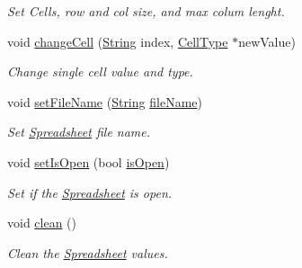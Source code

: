 \begin{DoxyCompactItemize}
\begin{DoxyCompactList}\small\item\em Set Cells, row and col size, and max colum lenght. \end{DoxyCompactList}\item 
\mbox{\label{class_spreadsheet_a0bf601cc24e9a3cc62a116e1e8e3a74f}} 
void \hyperlink{class_spreadsheet_a0bf601cc24e9a3cc62a116e1e8e3a74f}{change\+Cell} (\hyperlink{class_string}{String} index, \hyperlink{class_cell_type}{Cell\+Type} $\ast$new\+Value)
\begin{DoxyCompactList}\small\item\em Change single cell value and type. \end{DoxyCompactList}\item 
\mbox{\label{class_spreadsheet_a24589d9a703aa835682bf3222e944ddb}} 
void \hyperlink{class_spreadsheet_a24589d9a703aa835682bf3222e944ddb}{set\+File\+Name} (\hyperlink{class_string}{String} \hyperlink{class_spreadsheet_a29e1c16f68d43f5ce96c15f1c18c71de}{file\+Name})
\begin{DoxyCompactList}\small\item\em Set \hyperlink{class_spreadsheet}{Spreadsheet} file name. \end{DoxyCompactList}\item 
\mbox{\label{class_spreadsheet_aa3a53ae9bccfcaf880465198dc7f4e33}} 
void \hyperlink{class_spreadsheet_aa3a53ae9bccfcaf880465198dc7f4e33}{set\+Is\+Open} (bool \hyperlink{class_spreadsheet_a4c8bab95a22c86d5a8a75e54a7e82c51}{is\+Open})
\begin{DoxyCompactList}\small\item\em Set if the \hyperlink{class_spreadsheet}{Spreadsheet} is open. \end{DoxyCompactList}\item 
void \hyperlink{class_spreadsheet_a5c0f7b4ebd4da1741a662fe595f32cbc}{clean} ()
\begin{DoxyCompactList}\small\item\em Clean the \hyperlink{class_spreadsheet}{Spreadsheet} values. \end{DoxyCompactList}\end{DoxyCompactItemize}

